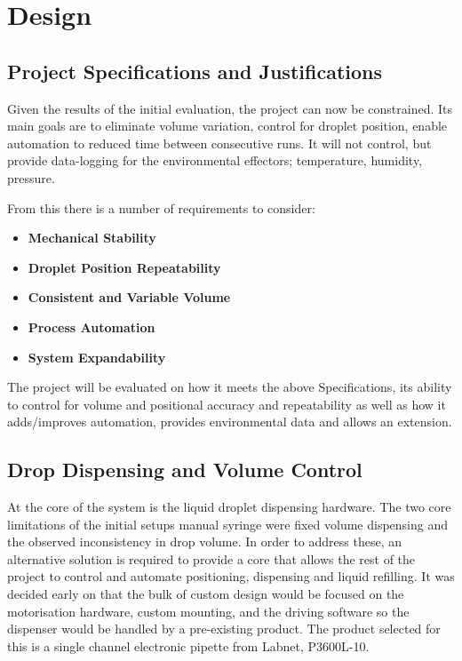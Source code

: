\chapter{Design}\label{C:des}

\section{Project Specifications and Justifications}
Given the results of the initial evaluation, the project can now be constrained. Its main goals are to eliminate volume variation, control for droplet position, enable automation to reduced time between consecutive runs. It will not control, but provide data-logging for the environmental effectors; temperature, humidity, pressure.

From this there is a number of requirements to consider:

\begin{itemize}
    \item \textbf{Mechanical Stability}
    \item \textbf{Droplet Position Repeatability}
    \item \textbf{Consistent and Variable Volume}
    \item \textbf{Process Automation}
    \item \textbf{System Expandability}
\end{itemize}

The project will be evaluated on how it meets the above Specifications, its ability to control for volume and positional accuracy and repeatability as well as how it adds/improves automation, provides environmental data and allows an extension.


\section{Drop Dispensing and Volume Control}

At the core of the system is the liquid droplet dispensing hardware. The two core limitations of the initial setups manual syringe were fixed volume dispensing and the observed inconsistency in drop volume. In order to address these, an alternative solution is required to provide a core that allows the rest of the project to control and automate positioning, dispensing and liquid refilling. It was decided early on that the bulk of custom design would be focused on the motorisation hardware, custom mounting, and the driving software so the dispenser would be handled by a pre-existing product. The product selected for this is a single channel electronic pipette from Labnet, P3600L-10. 

